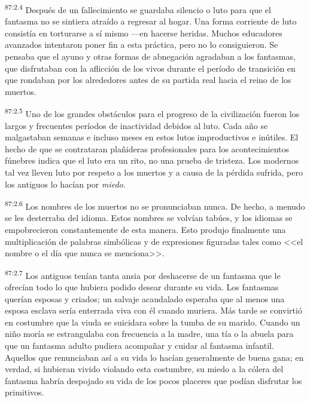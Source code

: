 \documentclass[twoside, 11pt]{book}
\begin{document}
\par
\textsuperscript{87:2.4} Después de un fallecimiento se guardaba silencio o luto para que el fantasma no se sintiera atraído a regresar al hogar. Una forma corriente de luto consistía en torturarse a sí mismo ---en hacerse heridas. Muchos educadores avanzados intentaron poner fin a esta práctica, pero no lo consiguieron. Se pensaba que el ayuno y otras formas de abnegación agradaban a los fantasmas, que disfrutaban con la aflicción de los vivos durante el período de transición en que rondaban por los alrededores antes de su partida real hacia el reino de los muertos.

\par
\textsuperscript{87:2.5} Uno de los grandes obstáculos para el progreso de la civilización fueron los largos y frecuentes períodos de inactividad debidos al luto. Cada año se malgastaban semanas e incluso meses en estos lutos improductivos e inútiles. El hecho de que se contrataran plañideras profesionales para los acontecimientos fúnebres indica que el luto era un rito, no una prueba de tristeza. Los modernos tal vez lleven luto por respeto a los muertos y a causa de la pérdida sufrida, pero los antiguos lo hacían por \textit{miedo}.

\par
\textsuperscript{87:2.6} Los nombres de los muertos no se pronunciaban nunca. De hecho, a menudo se les desterraba del idioma. Estos nombres se volvían tabúes, y los idiomas se empobrecieron constantemente de esta manera. Esto produjo finalmente una multiplicación de palabras simbólicas y de expresiones figuradas tales como <<el nombre o el día que nunca se menciona>>.

\par
\textsuperscript{87:2.7} Los antiguos tenían tanta ansia por deshacerse de un fantasma que le ofrecían todo lo que hubiera podido desear durante su vida. Los fantasmas querían esposas y criados; un salvaje acaudalado esperaba que al menos una esposa esclava sería enterrada viva con él cuando muriera. Más tarde se convirtió en costumbre que la viuda se suicidara sobre la tumba de su marido. Cuando un niño moría se estrangulaba con frecuencia a la madre, una tía o la abuela para que un fantasma adulto pudiera acompañar y cuidar al fantasma infantil. Aquellos que renunciaban así a su vida lo hacían generalmente de buena gana; en verdad, si hubieran vivido violando esta costumbre, su miedo a la cólera del fantasma habría despojado su vida de los pocos placeres que podían disfrutar los primitivos.
\end{document}
